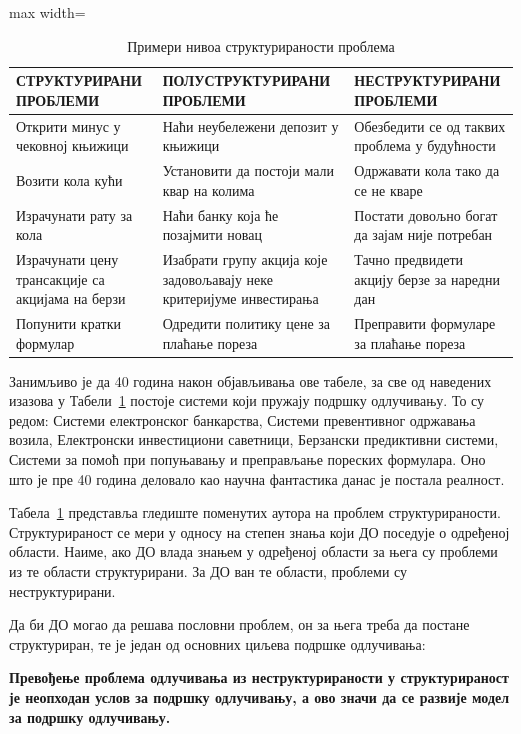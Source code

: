 \begin{table}[h]
\centering
\begin{adjustbox}{max width=\textwidth}
\begin{tabular}{|l|l|l|}
\hline
\textbf{СТРУКТУРИРАНИ ПРОБЛЕМИ} & \textbf{ПОЛУСТРУКТУРИРАНИ ПРОБЛЕМИ} & \textbf{НЕСТРУКТУРИРАНИ ПРОБЛЕМИ} \\
\hline
Открити минус у чековној књижици & Наћи неубележени депозит у књижици & Обезбедити се од таквих проблема у будућности \\
\hline
Возити кола кући & Установити да постоји мали квар на колима & Одржавати кола тако да се не кваре \\
\hline
Израчунати рату за кола & Наћи банку која ће позајмити новац & Постати довољно богат да зајам није потребан \\
\hline
Израчунати цену трансакције са акцијама на берзи & Изабрати групу акција које задовољавају неке критеријуме инвестирања & Тачно предвидети акцију берзе за наредни дан \\
\hline
Попунити кратки формулар & Одредити политику цене за плаћање пореза & Преправити формуларе за плаћање пореза \\
\hline
\end{tabular}
\end{adjustbox}
    \caption{Примери нивоа структурираности проблема}
    \label{tab:01-1}
\end{table}

Занимљиво је да 40 година након објављивања ове табеле, за све од наведених изазова у Табели~\ref{tab:01-1} постоје системи који пружају подршку одлучивању. То су редом: Системи електронског банкарства, Системи превентивног одржавања возила, Електронски инвестициони саветници, Берзански предиктивни системи, Системи за помоћ при попуњавању и преправљање пореских формулара. Оно што је пре 40 година деловало као научна фантастика данас је постала реалност.

Табела~\ref{tab:01-1} представља гледиште поменутих аутора на проблем структурираности. Структурираност се мери у односу на степен знања који ДО поседује о одређеној области. Наиме, ако ДО влада знањем у одређеној области за њега су проблеми из те области структурирани. За ДО ван те области, проблеми су неструктурирани.

Да би ДО могао да решава пословни проблем, он за њега треба да постане структуриран, те је један од основних циљева подршке одлучивања:

\textbf{Превођење проблема одлучивања из неструктурираности у структурираност је неопходан услов за подршку одлучивању, а ово значи да се развије модел за подршку одлучивању.}

